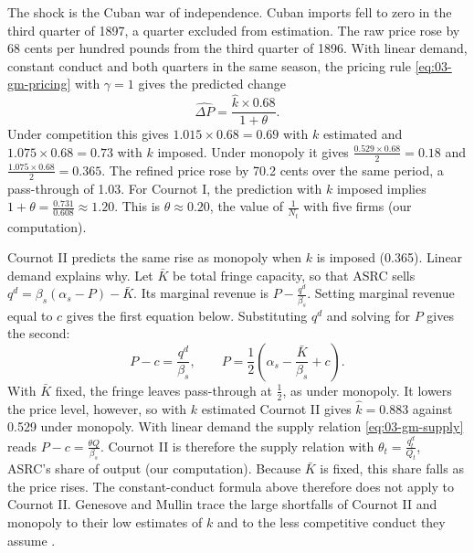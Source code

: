 The shock is the Cuban war of independence. Cuban imports fell to zero in the third quarter of 1897, a
quarter excluded from estimation. The raw price rose by 68 cents per hundred pounds from the third quarter of
1896. With linear demand, constant conduct and both quarters in the same season, the pricing rule
\eqref{eq:03-gm-pricing} with $\gamma = 1$ gives the predicted change \citep[p.~374]{GenesoveMullin1998}
\begin{equation*}
\widehat{\Delta P} = \frac{\hat k \times 0.68}{1 + \theta}.
\end{equation*}
Under competition this gives $1.015 \times 0.68 = 0.69$ with $k$ estimated and $1.075 \times 0.68 = 0.73$ with
$k$ imposed. Under monopoly it gives $\frac{0.529 \times 0.68}{2} = 0.18$ and $\frac{1.075 \times 0.68}{2} =
0.365$. The refined price rose by 70.2 cents over the same period, a pass-through of 1.03. For Cournot I, the
prediction with $k$ imposed implies $1 + \theta = \frac{0.731}{0.608} \approx 1.20$. This is $\theta \approx
0.20$, the value of $\frac{1}{N_t}$ with five firms (our computation).

Cournot II predicts the same rise as monopoly when $k$ is imposed (0.365). Linear demand explains why. Let
$\bar K$ be total fringe capacity, so that ASRC sells $q^d = \beta_s(\alpha_s - P) - \bar K$. Its marginal
revenue is $P - \frac{q^d}{\beta_s}$. Setting marginal revenue equal to $c$ gives the first equation below.
Substituting $q^d$ and solving for $P$ gives the second:
\begin{equation*}
P - c = \frac{q^d}{\beta_s},
\qquad
P = \frac{1}{2}\left(\alpha_s - \frac{\bar K}{\beta_s} + c\right).
\end{equation*}
With $\bar K$ fixed, the fringe leaves pass-through at $\frac{1}{2}$, as under monopoly. It lowers the price
level, however, so with $k$ estimated Cournot II gives $\hat k = 0.883$ against 0.529 under monopoly. With
linear demand the supply relation \eqref{eq:03-gm-supply} reads $P - c = \frac{\theta Q}{\beta_s}$. Cournot II
is therefore the supply relation with $\theta_t = \frac{q^d_t}{Q_t}$, ASRC's share of output (our
computation). Because $\bar K$ is fixed, this share falls as the price rises. The constant-conduct formula
above therefore does not apply to Cournot II. Genesove and Mullin trace the large shortfalls of Cournot II
and monopoly to their low estimates of $k$ and to the less competitive conduct they assume \citep[pp.~374--375]{GenesoveMullin1998}.

